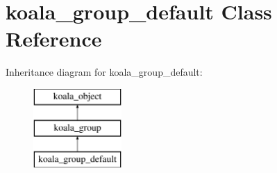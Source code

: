 \hypertarget{classkoala__group__default}{
\section{koala\_\-group\_\-default Class Reference}
\label{classkoala__group__default}
}
Inheritance diagram for koala\_\-group\_\-default:\begin{figure}[H]
\begin{center}
\leavevmode
\includegraphics[height=3.000000cm]{classkoala__group__default}
\end{center}
\end{figure}
